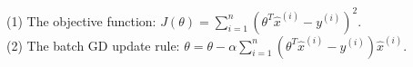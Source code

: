 \begin{answer}
(1) The objective function: $J(\theta) = \sum \limits_{i = 1}^{n} (\theta^T \hat{x}^{(i)} - y^{(i)})^2$. \\
(2) The batch GD update rule: $ \theta = \theta - \alpha \sum \limits_{i = 1}^{n} (\theta^T \hat{x}^{(i)} - y^{(i)}) \hat{x}^{(i)} $. \\
\end{answer}
